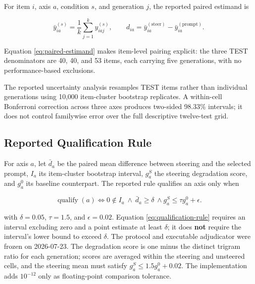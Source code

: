 \documentclass[manuscript,review,anonymous]{acmart}
\begin{document}
For item \(i\), axis \(a\), condition \(s\), and generation \(j\), the reported paired estimand is

\begin{equation}
\bar y^{(s)}_{ia}=\frac{1}{k}\sum_{j=1}^{k}y^{(s)}_{iaj},\qquad
d_{ia}=\bar y^{(\mathrm{steer})}_{ia}-\bar y^{(\mathrm{prompt})}_{ia}.
\label{eq:paired-estimand}
\end{equation}


Equation \ref{eq:paired-estimand} makes item-level pairing explicit: the three TEST denominators are 40, 40, and 53 items, each carrying five generations, with no performance-based exclusions.

The reported uncertainty analysis resamples TEST items rather than individual generations using 10,000 item-cluster bootstrap replicates. {}%
A within-cell Bonferroni correction across three axes produces two-sided 98.33\% intervals; it does not control familywise error over the full descriptive twelve-test grid. {}%
{}%

\subsection{Reported Qualification Rule}\label{reported-qualification-rule}

For axis \(a\), let \(\bar d_a\) be the paired mean difference between steering and the selected prompt, \(I_a\) its item-cluster bootstrap interval, \(g_a^S\) the steering degradation score, and \(g_a^0\) its baseline counterpart. The reported rule qualifies an axis only when

\begin{equation}
\operatorname{qualify}(a)\iff
0 \notin I_a\ \land\ \bar d_a\ge\delta\ \land
g_a^S\le\tau g_a^0+\epsilon.
\label{eq:qualification-rule}
\end{equation}

with \(\delta=0.05\), \(\tau=1.5\), and \(\epsilon=0.02\). {}%
{}%
{}%
Equation \ref{eq:qualification-rule} requires an interval excluding zero and a point estimate at least \(\delta\); it does \textbf{not} require the interval's lower bound to exceed \(\delta\). The protocol and executable adjudicator were frozen on 2026-07-23. The degradation score is one minus the distinct trigram ratio for each generation; scores are averaged within the steering and unsteered cells, and the steering mean must satisfy \(g_a^S\le1.5g_a^0+0.02\). The implementation adds \(10^{-12}\) only as floating-point comparison tolerance.
\end{document}
